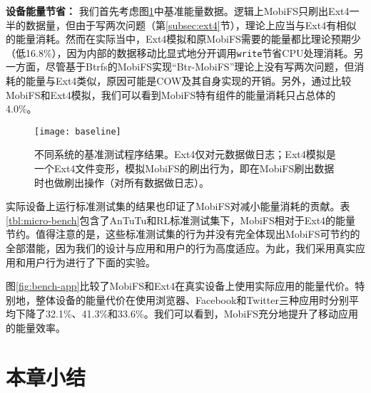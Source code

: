 \noindent\textbf{设备能量节省：}
我们首先考虑图\ref{fig:baseline}中基准能量数据。逻辑上MobiFS只刷出Ext4一半的数据量，但由于写两次问题（第\ref{subsec:ext4}节），理论上应当与Ext4有相似的能量消耗。然而在实际当中，Ext4模拟和原MobiFS需要的能量都比理论预期少（低16.8\%），因为内部的数据移动比显式地分开调用\texttt{write}节省CPU处理消耗。另一方面，尽管基于Btrfs的MobiFS实现“Btr-MobiFS”理论上没有写两次问题，但消耗的能量与Ext4类似，原因可能是COW及其自身实现的开销。另外，通过比较MobiFS和Ext4模拟，我们可以看到MobiFS特有组件的能量消耗只占总体的4.0\%。

\begin{figure}[!ht]
  \centering
  \texttt{[image: baseline]}
  \caption{不同系统的基准测试程序结果。Ext4仅对元数据做日志；Ext4模拟是一个Ext4文件变形，模拟MobiFS的刷出行为，即在MobiFS刷出数据时也做刷出操作（对所有数据做日志）。}
  \label{fig:baseline}
\end{figure}

实际设备上运行标准测试集的结果也印证了MobiFS对减小能量消耗的贡献。表\ref{tbl:micro-bench}包含了AnTuTu和RL标准测试集下，MobiFS相对于Ext4的能量节约。值得注意的是，这些标准测试集的行为并没有完全体现出MobiFS可节约的全部潜能，因为我们的设计与应用和用户的行为高度适应。为此，我们采用真实应用和用户行为进行了下面的实验。

图\ref{fig:bench-app}比较了MobiFS和Ext4在真实设备上使用实际应用的能量代价。特别地，整体设备的能量代价在使用浏览器、Facebook和Twitter三种应用时分别平均下降了32.1\%、41.3\%和33.6\%。我们可以看到，MobiFS充分地提升了移动应用的能量效率。

\section{本章小结}


